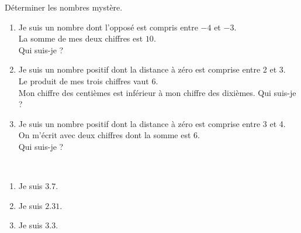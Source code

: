 \begin{exercice*}
   Déterminer les nombres mystère.
   \begin{enumerate}      
         \item Je suis un nombre dont l'opposé est compris entre $-4$ et $-3$.\\
      La somme de mes deux chiffres est $10$.\\
      Qui suis-je ?
         \item Je suis un nombre positif dont la distance à zéro est comprise entre 2 et 3.\\
      Le produit de mes trois chiffres vaut 6.\\
      Mon chiffre des centièmes est inférieur à mon chiffre des dixièmes. Qui suis-je ?
         \item Je suis un nombre positif dont la distance à zéro est comprise entre 3 et 4.\\
      On m'écrit avec deux chiffres dont la somme est 6.\\
      Qui suis-je ?      
      \end{enumerate}
 \end{exercice*}
 
 \begin{corrige}
    \ \\ [-5mm]
    \begin{enumerate}
      \item Je suis $\num{3.7}$.
      \item Je suis $\num{2.31}$.
      \item Je suis $\num{3.3}$.
   \end{enumerate}
 \end{corrige}